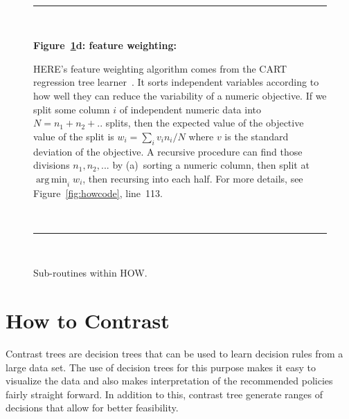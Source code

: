 \documentclass[conference]{IEEEtran}
\newcommand{\fig}[1]{Figure~\ref{fig:#1}}
\DeclareMathOperator*{\argmin}{arg\,min}
\begin{document}
\begin{figure}[t]
    ~\hrule~
    
    {\bf \fig{where}d: feature weighting:}
    
    HERE's feature weighting algorithm
    comes from the CART regression tree learner~\cite{Breiman1984}.
    It sorts independent variables
    according to how well they can reduce the variability
    of a  numeric objective.
    If we split some column $i$ of independent numeric data  into $N=n_1 + n_2 + ..$ splits,
    then the expected
    value of the objective value of the split  is $w_i = \sum_i v_in_i/N$
    where $v$ is the standard deviation of the objective.
    A recursive procedure can  find those divisions $n_1,n_2,...$ by (a)~sorting a numeric column,
    then split at $\argmin_i w_i$, then recursing into each half.  For more details, see  \fig{howcode}, line~113.
    
    ~\hrule~
    
    \caption{Sub-routines within HOW.}\label{fig:where}
\end{figure}

\section{How to Contrast}
Contrast trees are decision trees that can be used to learn decision rules from a large data set. The use of decision trees for this purpose makes it easy to visualize the data and also makes interpretation of the recommended policies fairly straight forward. In addition to this, contrast tree generate ranges of decisions that allow for better feasibility.
\end{document}
